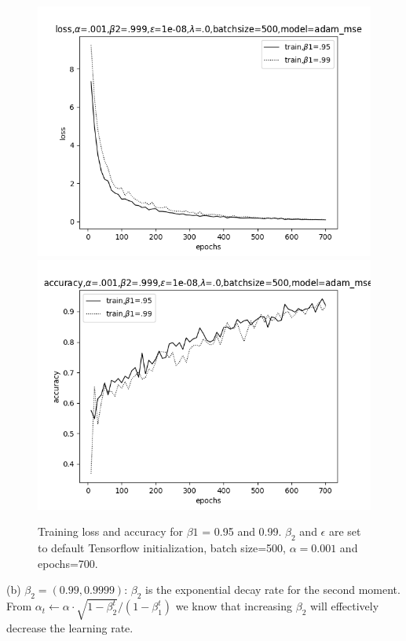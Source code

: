 \documentclass[12pt]{article}
\newenvironment{problem}[2][Problem]{\begin{trivlist}
\item[\hskip \labelsep {\bfseries #1}\hskip \labelsep {\bfseries #2.}]}{\end{trivlist}}
\begin{document}
\begin{problem}{3}
\begin{figure}[!htb]
  \includegraphics[width=\linewidth]{images/a1/3.4/a/train_loss.png}
\endminipage\hfill
{}
  \includegraphics[width=\linewidth]{images/a1/3.4/a/train_accuracy.png}
\endminipage

\caption{Training loss and accuracy for  $\beta1$ = 0.95 and 0.99.
\newline
$\beta_2$ and $\epsilon$ are set to default Tensorflow initialization, batch size=500, $\alpha=0.001$ and epochs=700.  }\label{fig:3-4-a}
\end{figure}

\bigskip
\newpage
(b) $\beta_2 = (0.99, 0.9999)$: $\beta_2$ is the exponential decay rate for the second moment. From $\alpha_t \gets \alpha \cdot \sqrt{1 - \beta_2^t} / (1 - \beta_1^t)$ we know that increasing $\beta_2$ will effectively decrease the learning rate.


\end{problem}
\end{document}
